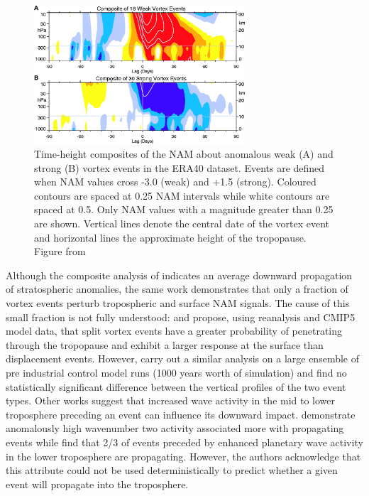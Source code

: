 {\begin{figure}[h!]
\centering
    \includegraphics[width=0.7\textwidth]{Figures/Figures-background/baldwin_composite.jpg}
    \caption[Time-height composites of the NAM about anomalous vortex events in the ERA40 dataset from \cite{baldwinStratospheric2001a}.]{Time-height composites of the NAM about anomalous weak (A) and strong (B) vortex events in the ERA40 dataset. Events are defined when NAM values cross -3.0 (weak) and +1.5 (strong). Coloured contours are spaced at 0.25 NAM intervals while white contours are spaced at 0.5. Only NAM values with a magnitude greater than 0.25 are shown. Vertical lines denote the central date of the vortex event and horizontal lines the approximate height of the tropopause. Figure from \cite{baldwinStratospheric2001a}}  
    \label{fig:Baldwin_composite}
\centering
\end{figure}

Although the composite analysis of \cite{baldwinStratospheric2001a} indicates an average downward propagation of stratospheric anomalies, the same work demonstrates that only a fraction of vortex events perturb tropospheric and surface NAM signals. The cause of this small fraction is not fully understood: \cite{Mitchell2011} and \cite{Seviour2016} propose, using reanalysis and CMIP5 model data, that split vortex events have a greater probability of penetrating through the tropopause and exhibit a larger response at the surface than displacement events. However, \cite{Maycock2015} carry out a similar analysis on a large ensemble of pre industrial control model runs (1000 years worth of simulation) and find no statistically significant difference between the vertical profiles of the two event types. Other works suggest that increased wave activity in the mid to lower troposphere preceding an event can influence its downward impact. \cite{Nakagawa2006} demonstrate anomalously high wavenumber two activity associated more with propagating events while \cite{White2019} find that 2/3 of events preceded by enhanced planetary wave activity in the lower troposphere are propagating. However, the authors acknowledge that this attribute could not be used deterministically to predict whether a given event will propagate into the troposphere.

}
